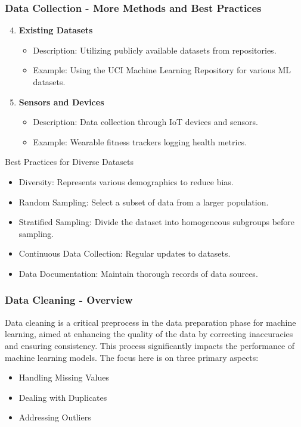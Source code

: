 \documentclass[aspectratio=169]{beamer}
\begin{document}
\begin{frame}[fragile]
    \frametitle{Data Collection - More Methods and Best Practices}
    \begin{enumerate}\setcounter{enumi}{3}
        \item \textbf{Existing Datasets}
            \begin{itemize}
                \item Description: Utilizing publicly available datasets from repositories.
                \item Example: Using the UCI Machine Learning Repository for various ML datasets.
            \end{itemize}

        \item \textbf{Sensors and Devices}
            \begin{itemize}
                \item Description: Data collection through IoT devices and sensors.
                \item Example: Wearable fitness trackers logging health metrics.
            \end{itemize}
    \end{enumerate}

    \begin{block}{Best Practices for Diverse Datasets}
        \begin{itemize}
            \item Diversity: Represents various demographics to reduce bias.
            \item Random Sampling: Select a subset of data from a larger population.
            \item Stratified Sampling: Divide the dataset into homogeneous subgroups before sampling.
            \item Continuous Data Collection: Regular updates to datasets.
            \item Data Documentation: Maintain thorough records of data sources.
        \end{itemize}
    \end{block}
\end{frame}

\begin{frame}[fragile]
    \frametitle{Data Cleaning - Overview}
    Data cleaning is a critical preprocess in the data preparation phase for machine learning, aimed at enhancing the quality of the data by correcting inaccuracies and ensuring consistency. This process significantly impacts the performance of machine learning models. The focus here is on three primary aspects:
    \begin{itemize}
        \item Handling Missing Values
        \item Dealing with Duplicates
        \item Addressing Outliers
    \end{itemize}
\end{frame}
\end{document}
